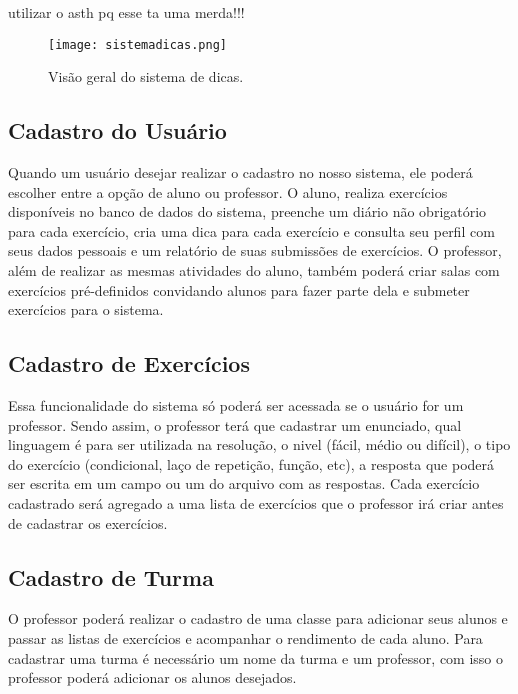 utilizar o asth pq esse ta uma merda!!!

\begin{figure}[h]
	\captionsetup{justification=centering}
	\texttt{[image: sistemadicas.png]}
	\caption{Visão geral do sistema de dicas.}
	\label{figura:sistemadicas}
\end{figure}

\subsection{Cadastro do Usuário}

Quando um usuário desejar realizar o cadastro no nosso sistema, ele poderá escolher entre a opção de aluno ou professor. O aluno, realiza exercícios disponíveis no banco de dados do sistema, preenche um diário não obrigatório para cada exercício, cria uma dica para cada exercício e consulta seu perfil com seus dados pessoais e um relatório de suas submissões de exercícios. O professor, além de realizar as mesmas atividades do aluno, também poderá criar salas com exercícios pré-definidos convidando alunos para fazer parte dela e submeter exercícios para o sistema.

\subsection{Cadastro de Exercícios}

Essa funcionalidade do sistema só poderá ser acessada se o usuário for um professor. Sendo assim, o professor terá que cadastrar um enunciado, qual linguagem é para ser utilizada na resolução, o nivel (fácil, médio ou difícil), o tipo do exercício (condicional, laço de repetição, função, etc), a resposta que poderá ser escrita em um campo ou um  do arquivo com as respostas. Cada exercício cadastrado será agregado a uma lista de exercícios que o professor irá criar antes de cadastrar os exercícios.



\subsection{Cadastro de Turma}

O professor poderá realizar o cadastro de uma classe para adicionar seus alunos e passar as listas de exercícios e acompanhar o rendimento de cada aluno. Para cadastrar uma turma é necessário um nome da turma e um professor, com isso o professor poderá adicionar os alunos desejados.

